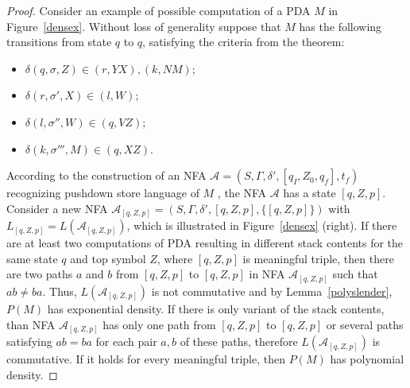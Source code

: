 \begin{proof}
Consider an example of possible computation of a PDA $M$ in Figure~\ref{densex}. Without loss of generality suppose that $M$ has the following transitions from state $q$ to $q$, satisfying the criteria from the theorem:
\begin{itemize}
\item $\delta(q, \sigma, Z) \in (r, YX), (k, NM)$;
\item $\delta(r, \sigma', X) \in (l, W)$;
\item $\delta(l, \sigma'', W) \in (q, VZ)$;
\item $\delta(k, \sigma''', M) \in (q, XZ)$.
\end{itemize}
According to the construction of an NFA $\mathcal{A} = (S,\Gamma,\delta',[q_I, Z_0, q_f], t_f)$ recognizing pushdown store language of $M$ \cite{Malcher}, the NFA $\mathcal{A}$ has a state $[q, Z, p]$. Consider a new NFA $\mathcal{A}_{[q, Z, p]} = (S,\Gamma,\delta',[q, Z, p], \{[q, Z, p]\})$ with $L_{[q, Z, p]} = L(\mathcal{A}_{[q, Z, p]})$, which is illustrated in Figure~\ref{densex} (right). If there are at least two computations of PDA resulting in different stack contents for the same state $q$ and top symbol $Z$, where $[q, Z, p]$ is meaningful triple, then there are two paths $a$ and $b$ from $[q, Z, p]$ to $[q, Z, p]$ in NFA $\mathcal{A}_{[q, Z, p]}$ such that $ab \neq ba$. Thus, $L(\mathcal{A}_{[q, Z, p]})$ is not commutative and by Lemma~\ref{polyslender}, $P(M)$ has exponential density. If there is only variant of the stack contents, than NFA $\mathcal{A}_{[q, Z, p]}$ has only one path from $[q, Z, p]$ to $[q, Z, p]$ or several paths satisfying $ab = ba$ for each pair $a, b$ of these paths, therefore $L(\mathcal{A}_{[q, Z, p]})$ is commutative. If it holds for every meaningful triple, then $P(M)$ has polynomial density.
\end{proof}






